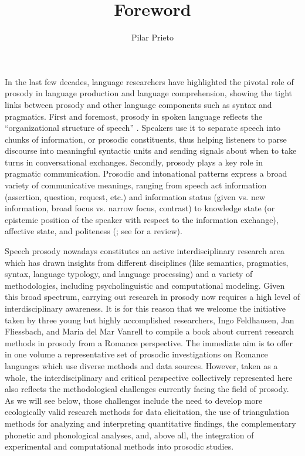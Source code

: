 \documentclass[output=paper]{langsci/langscibook}
\title{Foreword}
\author{Pilar Prieto\affiliation{ICREA-Universitat Pompeu Fabra}}
\begin{document}
\label{chap:prefaceEd}
In the last few decades, language researchers have highlighted the pivotal role of prosody in language production and language comprehension, showing the tight links between prosody and other language components such as syntax and pragmatics. First and foremost, prosody in spoken language reflects the ``organizational structure of speech'' \citep{Beckman.1996}. Speakers use it to separate speech into chunks of information, or prosodic constituents, thus helping listeners to parse discourse into meaningful syntactic units and sending signals about when to take turns in conversational exchanges. Secondly, prosody plays a key role in pragmatic communication. Prosodic and intonational patterns express a broad variety of communicative meanings, ranging from speech act information (assertion, question, request, etc.) and information status (given vs. new information, broad focus vs. narrow focus, contrast) to knowledge state (or epistemic position of the speaker with respect to the information exchange), affective state, and politeness (\citealt{Gussenhoven2004,Ladd2008,Nespor2007}; see \citealt{Prieto.2015} for a review). 

Speech prosody nowadays constitutes an active interdisciplinary research area which has drawn insights from different disciplines (like semantics, pragmatics, syntax, language typology, and language processing) and a variety of methodologies, including psycholinguistic and computational modeling. Given this broad spectrum, carrying out research in prosody now requires a high level of interdisciplinary awareness. It is for this reason that we welcome the initiative taken by three young but highly accomplished researchers, Ingo Feldhausen, Jan Fliessbach, and Maria del Mar Vanrell to compile a book about current research methods in prosody from a Romance perspective. The immediate aim is to offer in one volume a representative set of prosodic investigations on Romance languages which use diverse methods and data sources. However, taken as a whole, the interdisciplinary and critical perspective collectively represented here also reflects the methodological challenges currently facing the field of prosody. As we will see below, those challenges include the need to develop more ecologically valid research methods for data elicitation, the use of triangulation methods for analyzing and interpreting quantitative findings, the complementary phonetic and phonological analyses, and, above all, the integration of experimental and computational methods into prosodic studies. 
\end{document}
